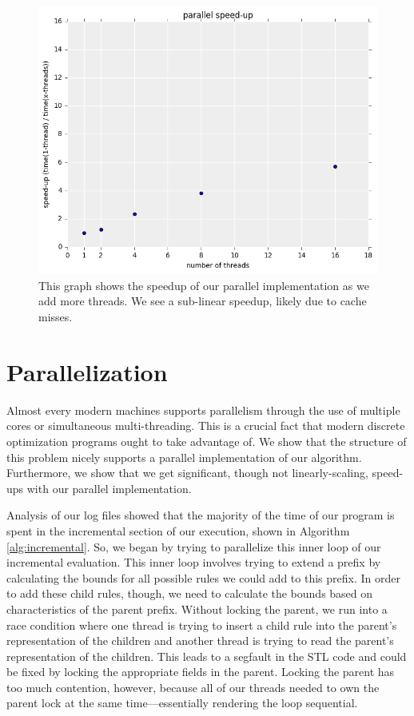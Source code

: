 \begin{figure}[t!]
	\begin{center}
	\includegraphics[width=\textwidth]{figs/parallel_speedup.png}
	\caption{This graph shows the speedup of our parallel implementation as we add more threads. 
We see a sub-linear speedup, likely due to cache misses.}
	\end{center}
\label{fig:parallel}
\end{figure}

\section{Parallelization}
Almost every modern machines supports parallelism through the use of multiple cores or simultaneous multi-threading.
This is a crucial fact that modern discrete optimization programs ought to take advantage of.
We show that the structure of this problem nicely supports a parallel implementation of our algorithm.
Furthermore, we show that we get significant, though not linearly-scaling, speed-ups with our parallel implementation.

Analysis of our log files showed that the majority of the time of our program is spent in the incremental section of our execution, shown in Algorithm \ref{alg:incremental}.
So, we began by trying to parallelize this inner loop of our incremental evaluation.
This inner loop involves trying to extend a prefix by calculating the bounds for all possible rules we could add to this prefix.
In order to add these child rules, though, we need to calculate the bounds based on characteristics of the parent prefix.
Without locking the parent, we run into a race condition where one thread is trying to insert a child rule into the parent's representation of the children and another thread is trying to read the parent's representation of the children.
This leads to a segfault in the STL code and could be fixed by locking the appropriate fields in the parent.
Locking the parent has too much contention, however, because all of our threads needed to own the parent lock at the same time---essentially rendering the loop sequential.

